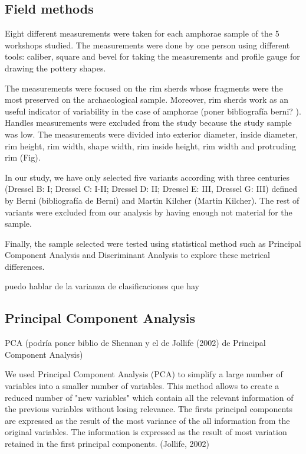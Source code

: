 \documentclass[review, twocolumn]{elsarticle}
\begin{document}
\subsection{Field methods}


Eight different measurements were taken for each amphorae sample of the 5 workshops studied. The measurements were done by one person using different tools: caliber, square and bevel for taking the measurements and profile gauge for drawing the pottery shapes. 

The measurements were focused on the rim sherds whose fragments were the most preserved on the archaeological sample. Moreover, rim sherds work as an useful indicator of variability in the case of amphorae (poner bibliografía berni? ). Handles measurements were excluded from the study because the study sample was low. The measurements were divided into exterior diameter, inside diameter, rim height, rim width, shape width, rim inside height, rim width and protruding rim (Fig). 

In our study, we have only selected five variants according with three centuries (Dressel B: I; Dressel C: I-II; Dressel D: II; Dressel E: III, Dressel G: III) defined by Berni (bibliografía de Berni) and Martin Kilcher (Martin Kilcher). The rest of variants were excluded from our analysis by having enough not material for the sample. 

Finally, the sample selected were tested using statistical method such as Principal Component Analysis and Discriminant Analysis to explore these metrical differences. 
 
puedo hablar de la varianza de clasificaciones que hay

\subsection{Principal Component Analysis}

PCA (podría poner biblio de Shennan y el de Jollife (2002) de Principal Component Analysis)

We used Principal Component Analysis (PCA) to simplify a large number of variables into a smaller number of variables. This method allows to create a reduced number of "new variables" which contain all the relevant information of the previous variables without losing relevance. The firsts principal components are expressed as the result of the most variance of the all information from the original variables.  
The information is expressed as the result of most variation retained in the first principal components. (Jollife, 2002)
\end{document}
